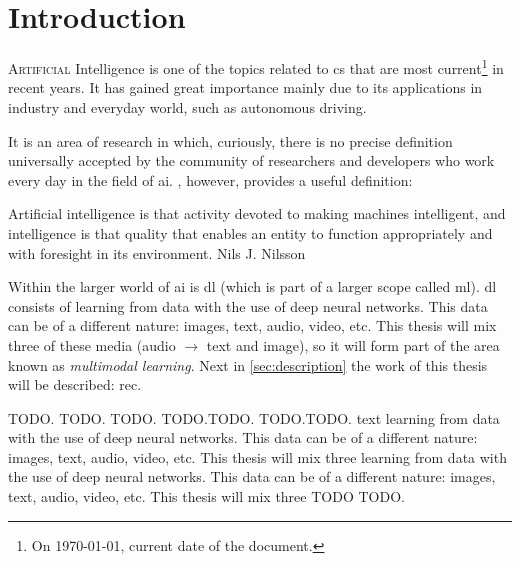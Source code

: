 

\chapter{Introduction}\label{cha:intro}



\lettrine{A}{rtificial} Intelligence is one of the topics related to \gls{cs}
that are most current\footnote{On \today, current date of the document.} in
recent years. It has gained great importance mainly due to its applications in
industry and everyday world, such as autonomous driving.

It is an area of research in which, curiously, there is no precise definition
universally accepted by the community of researchers and developers who work
every day in the field of \gls{ai}. ,
however, provides a useful definition:

\begin{quoteBox}
  Artificial intelligence is that activity devoted to making machines
  intelligent, and intelligence is that quality that enables an entity to
  function appropriately and with foresight in its environment.
  \tcblower{}Nils J. Nilsson
\end{quoteBox}

Within the larger world of \gls{ai} is \gls{dl} (which is part of a larger
scope called \gls{ml}). \gls{dl} consists of learning from data with the use of
deep neural networks. This data can be of a different nature: images, text,
audio, video, etc. This thesis will mix three of these media (audio
\(\rightarrow\) text and image), so it will form part of the area known as
\emph{multimodal learning}. Next in \vref{sec:description} the work of this
thesis will be described: \gls{rec}.%

TODO. TODO. TODO. TODO.TODO. TODO.TODO. text learning from data with the use of
deep neural networks. This data can be of a different nature: images, text,
audio, video, etc. This thesis will mix three learning from data with the use
of deep neural networks. This data can be of a different nature: images, text,
audio, video, etc. This thesis will mix three TODO TODO.



